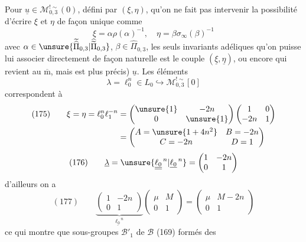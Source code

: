 Pour $\underline u\in\mathcal M_{0,3}^{!\sim}(0)$, défini par
$(\xi,\eta)$,  qu'on ne fait pas intervenir la
possibilité d'écrire $\xi$ et $\eta$ de façon unique comme
\[
\xi=\alpha\rho(\alpha)^{-1},\quad
\eta=\beta\sigma_\infty(\beta)^{-1}
\]
avec $\alpha\in\unsure{\widetilde{\widehat\Pi}_{0,3}|\widehat{\widetilde\Pi}_{0,3}}$,
$\beta\in\widehat\Pi_{0,3}$, les seuls invariants adéliques qu'on
puisse lui associer directement de façon naturelle est le couple
$(\underline\xi,\underline\eta)$, ou encore  qui revient au
$\overline{\mathrm m}$, mais est plus précis) $\underline u$.
Les éléments 
\[
\lambda=\ell_0^n\in L_0\hookrightarrow\mathcal M_{0,3}^{!\sim}[0]
\]
correspondent à
\[
\begin{aligned}
(175)\qquad
\xi=\eta=\ell_0^n\ell_1^{-n}
&=\begin{pmatrix}\unsure{1}&-2n\\0&\unsure{1}\end{pmatrix}
\begin{pmatrix}1&0\\-2n&1\end{pmatrix}\\
&=\begin{pmatrix}A=\unsure{1+4n^2}&B=-2n\\C=-2n&D=1\end{pmatrix}
\end{aligned}
\]
\[
(176)\qquad
\underline\lambda=\unsure{\underline{\underline{\ell_0}}^{\,n}|\underline{\ell_0}^{\,n}}
=\begin{pmatrix}1&-2n\\0&1\end{pmatrix}
\]
d'ailleurs on a
\[
(177)\qquad
\underbrace{\begin{pmatrix}1&-2n\\0&1\end{pmatrix}}_{\underline{\ell_0}^{\,n}}
\begin{pmatrix}\mu&M\\0&1\end{pmatrix}
=\begin{pmatrix}\mu&M-2n\\0&1\end{pmatrix}
\]
ce qui montre que 
sous-groupes $\mathcal B'_1$ de $\mathcal B$ (169) formés des
